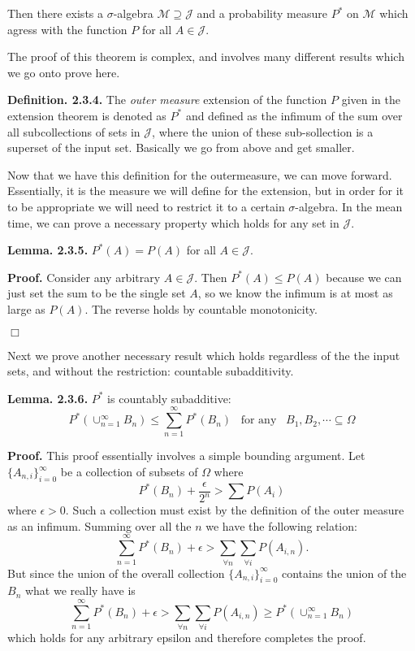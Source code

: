 \documentclass{article}
\begin{document}
\noindent Then there exists a $\sigma$-algebra $\mathcal{M} \supseteq \mathcal{J}$ and a probability measure $P^*$ on $\mathcal{M}$ which agress with the function $P$ for all $A \in \mathcal{J}$. 

\medskip

The proof of this theorem is complex, and involves many different results which we go onto prove here. 

\medskip

\noindent \textbf{Definition. 2.3.4.} The \emph{outer measure} extension of the function $P$ given in the extension theorem is denoted as $P^*$ and defined as the infimum of the sum over all subcollections of sets in $\mathcal{J}$, where the union of these sub-sollection is a superset of the input set. Basically we go from above and get smaller.  

\medskip

Now that we have this definition for the outermeasure, we can move forward. Essentially, it is the measure we will define for the extension, but in order for it to be appropriate we will need to restrict it to a certain $\sigma$-algebra. In the mean time, we can prove a necessary property which holds for any set in $\mathcal{J}$. 

\medskip

\noindent \textbf{Lemma. 2.3.5.} $P^*(A) = P(A)$ for all $A \in \mathcal{J}$. 

\noindent \textbf{Proof.} Consider any arbitrary $A \in \mathcal{J}$. Then $P^*(A) \leq P(A)$ because we can just set the sum to be the single set $A$, so we know the infimum is at most as large as $P(A)$. The reverse holds by countable monotonicity. 

\hfill $\Box$

\medskip

Next we prove another necessary result which holds regardless of the the input sets, and without the restriction: countable subadditivity. 

\medskip

\noindent \textbf{Lemma. 2.3.6.} $P^*$ is countably subadditive: \[P^*(\cup_{n=1}^\infty B_n) \leq \sum_{n=1}^\infty P^*(B_n) \;\;\; \text{for any} \;\;\; B_1, B_2, \cdots \subseteq \Omega \]

\noindent \textbf{Proof.} This proof essentially involves a simple bounding argument. Let $\{A_{n,i}\}_{i = 0}^\infty$ be a collection of subsets of $\Omega$ where \[ P^*(B_n) + \frac{\epsilon}{2^n} > \sum P(A_i)\] where $\epsilon > 0$. Such a collection must exist by the definition of the outer measure as an infimum. Summing over all the $n$ we have the following relation: \[\sum_{n=1}^\infty P^*(B_n) + \epsilon >  \sum_{\forall n} \sum_{\forall i} P(A_{i,n}).\] But since the union of the overall collection $\{A_{n,i}\}_{i = 0}^\infty$ contains the union of the $B_n$ what we really have is \[\sum_{n=1}^\infty P^*(B_n) + \epsilon >  \sum_{\forall n} \sum_{\forall i} P(A_{i,n}) \geq P^*(\cup_{n=1}^\infty B_n) \] which holds for any arbitrary epsilon and therefore completes the proof. 
\end{document}
